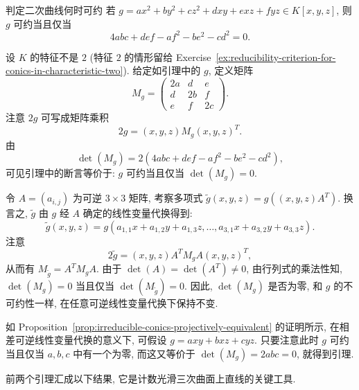 \begin{Lemma}{判定二次曲线何时可约}\leavevmode\label{lem:reducibility-criterion-for-conics}
若 $g=ax^{2}+by^{2}+cz^{2}+dxy+exz+fyz\in K[x,y,z]$, 则 $g$ 可约当且仅当
\[
  4abc+def-af^{2}-be^{2}-cd^{2}=0.
\]
\end{Lemma}
\begin{Proof}
设 $K$ 的特征不是 $2$ (特征 $2$ 的情形留给 Exercise~\ref{ex:reducibility-criterion-for-conics-in-characteristic-two}). 给定如引理中的 $g$, 定义矩阵
\[
  M_{g}=\begin{pmatrix}
    2a&d&e\\
    d&2b&f\\
    e&f&2c
  \end{pmatrix}.
\]
注意 $2g$ 可写成矩阵乘积
\[
  2g=(x,y,z)M_{g}(x,y,z)^{T}.
\]
由
\[
  \det(M_{g})=2(4abc+def-af^{2}-be^{2}-cd^{2}),
\]
可见引理中的断言等价于: $g$ 可约当且仅当 $\det(M_{g})=0$.

令 $A=(a_{i,j})$ 为可逆 $3\times3$ 矩阵, 考察多项式 $\tilde g(x,y,z)=g((x,y,z)A^{T})$. 换言之, $\tilde g$ 由 $g$ 经 $A$ 确定的线性变量代换得到:
\[
  \tilde g(x,y,z)=g(a_{1,1}x+a_{1,2}y+a_{1,3}z,\ldots,
  a_{3,1}x+a_{3,2}y+a_{3,3}z).
\]
注意
\[
  2\tilde g=(x,y,z)A^{T}M_{g}A(x,y,z)^{T},
\]
从而有 $M_{\tilde g}=A^{T}M_{g}A$. 由于 $\det(A)=\det(A^{T})\ne0$, 由行列式的乘法性知, $\det(M_{g})=0$ 当且仅当 $\det(M_{\tilde g})=0$. 因此, $\det(M_{g})$ 是否为零, 和 $g$ 的不可约性一样, 在任意可逆线性变量代换下保持不变.

如 Proposition~\ref{prop:irreducible-conics-projectively-equivalent} 的证明所示, 在相差可逆线性变量代换的意义下, 可假设 $g=axy+bxz+cyz$. 只要注意此时 $g$ 可约当且仅当 $a,b,c$ 中有一个为零, 而这又等价于 $\det(M_{g})=2abc=0$, 就得到引理.
\end{Proof}

前两个引理汇成以下结果, 它是计数光滑三次曲面上直线的关键工具.

